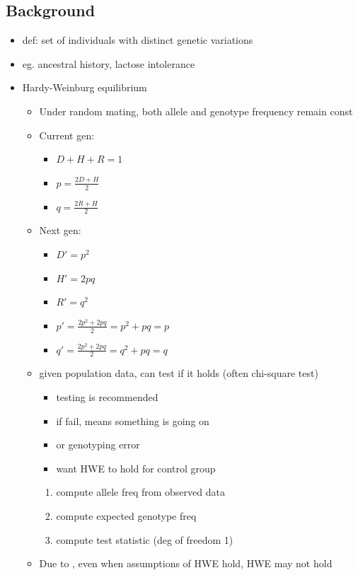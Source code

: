 \documentclass[font=12pt]{article}
\begin{document}
\subsection{Background}
\begin{itemize}
	\item def: set of individuals with distinct genetic variations
	\item eg. ancestral history, lactose intolerance
	\item Hardy-Weinburg equilibrium
	\begin{itemize}
		\item Under random mating, both allele and genotype frequency remain const
		\item Current gen:
		\begin{itemize}
			\item $ D + H + R = 1 $
			\item $ p = \frac{2D + H}{2} $
			\item $ q = \frac{2R + H}{2} $
		\end{itemize}
		\item Next gen:
		\begin{itemize}
			\item $ D' = p^2 $
			\item $ H' = 2pq $
			\item $ R' = q^2 $
			\item $ p' = \frac{2p^2 + 2pq}{2} = p^2 + pq = p $
			\item $ q' = \frac{2p^2 + 2pq}{2} = q^2 + pq = q$
		\end{itemize}
		\item given population data, can test if it holds (often chi-square test)
		\begin{itemize}
			\item testing is recommended
			\item if fail, means something is going on
			\item or genotyping error
			\item want HWE to hold for control group
		\end{itemize}
		\begin{enumerate}
			\item compute allele freq from observed data
			\item compute expected genotype freq
			\item compute test statistic (deg of freedom 1)
		\end{enumerate}
		\item Due to , even when assumptions of HWE hold, HWE may not hold

\end{itemize}
\end{itemize}
\end{document}
